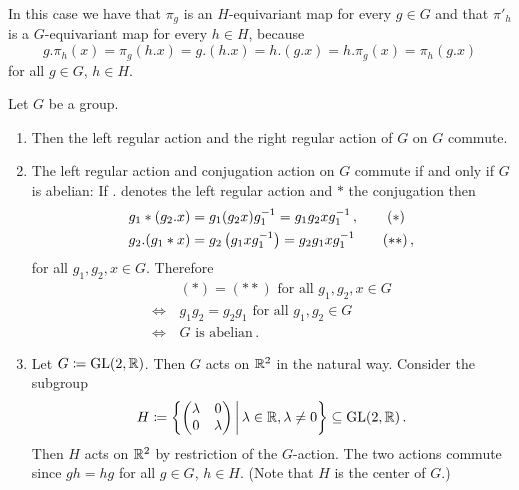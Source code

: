 \begin{remark}
  In this case we have that $\pi_g$ is an $H$-equivariant map for every $g \in G$ and that $\pi'_h$ is a $G$-equivariant map for every $h \in H$, because
  \[
      g.\pi_h(x)
    = \pi_g(h.x)
    = g.(h.x)
    = h.(g.x)
    = h.\pi_g(x)
    = \pi_h(g.x)
  \]
  for all $g \in G$, $h \in H$.
\end{remark}


\begin{example}
  \label{example: commuting actions}
  Let $G$ be a group.
  \begin{enumerate}[label=\alph*)]
    \item
      Then the left regular action and the right regular action of $G$ on $G$ commute.
    \item
      The left regular action and conjugation action on $G$ commute if and only if $G$ is abelian:
      If $.$ denotes the left regular action and $*$ the conjugation then
      \begin{align*}
            g_1*(g_2.x)
        &=  g_1 (g_2 x) g_1^{-1}
         =  g_1 g_2 x g_1^{-1} \,,
        \tag{\ensuremath{\ast}}
        \\
            g_2.(g_1*x)
        &=  g_2 \left(g_1 x g_1^{-1}\right)
         =  g_2 g_1 x g_1^{-1}
        \tag{\ensuremath{\ast\ast}} \,,
      \end{align*}
      for all $g_1, g_2, x \in G$.
      Therefore
      \begin{align*}
            &\, \text{$(\ast) = (\ast\ast)$ for all $g_1, g_2, x \in G$}  \\
        \iff&\, \text{$g_1 g_2 = g_2 g_1$ for all $g_1, g_2 \in G$}       \\
        \iff&\, \text{$G$ is abelian} \,.
      \end{align*}
    \item
      Let $G \coloneqq \operatorname{GL}(2,\mathbb{R})$.
      Then $G$ acts on $\mathbb{R}^2$ in the natural way.
      Consider the subgroup
      \[
                  H
        \defined  \left\{
                    \begin{pmatrix}
                      \lambda & 0       \\
                      0       & \lambda
                    \end{pmatrix}
                  \suchthat*
                    \lambda \in \Real,
                    \lambda \neq 0
                  \right\}
        \subseteq \GL(2,\Real) \,.
      \]
      Then $H$ acts on $\mathbb{R}^2$ by restriction of the $G$-action.
      The two actions commute since $gh = hg$ for all $g \in G$, $h \in H$.
      (Note that $H$ is the center of $G$.)
  \end{enumerate}
\end{example}





